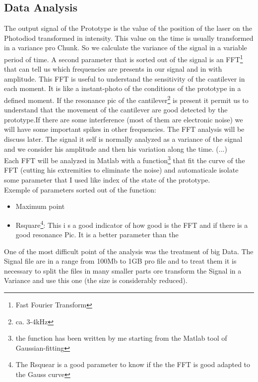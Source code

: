 \documentclass[11pt, a4paper]{article}
\begin{document}
\subsection{Data Analysis}%
The output signal of the Prototype is the value of the position of the laser on the Photodiod transformed in intensity. This value on the time is usually transformed in a variance pro Chunk. So we calculate the variance of the signal in a variable period of time.
A second parameter that is sorted out of the signal is an FFT\footnote{Fast Fourier Transform} that can tell us which frequencies are presents in our signal and in with amplitude\cite{ articolo sugli FFT}.
This FFT is useful to understand the sensitivity of the cantilever in each moment. It is like a instant-photo of the conditions of the prototype in a defined moment. If the resonance pic of the cantilever\footnote{ca. 3-4kHz} is present it permit us to understand that the movement of the cantilever are good detected by the prototype.If there are some interference (most of them are electronic noise) we will have some important spikes in other frequencies. The FFT analysis will be discuss later. The signal it self is normally analyzed as a variance of the signal and we consider his amplitude and then his variation along the time.
(...)%
\\Each FFT will be analyzed in Matlab with a function\footnote{the function has been written by me starting from the Matlab tool of Gaussian-fitting} that fit the curve of the FFT (cutting his extremities to eliminate the noise) and automaticale isolate some parameter that I used like index of the state of the prototype. 
\\Exemple of parameters sorted out of the function: 
\begin{itemize}
\item Maximum point
\item Rsquare\footnote{The Rsquear is a good parameter to know if the the FFT is good adapted to the Gauss curve}: This i s a good indicator of how good is the FFT and if there is a good resonance Pic. It is a better parameter than the  
\end{itemize}
One of the most difficult point of the analysis was the treatment of big Data. The Signal file are in a range from 100Mb to 1GB pro file and to treat them it is necessary to split the files in many smaller parts ore transform the Signal in a Variance and use this one (the size is considerably reduced). 
\end{document}
